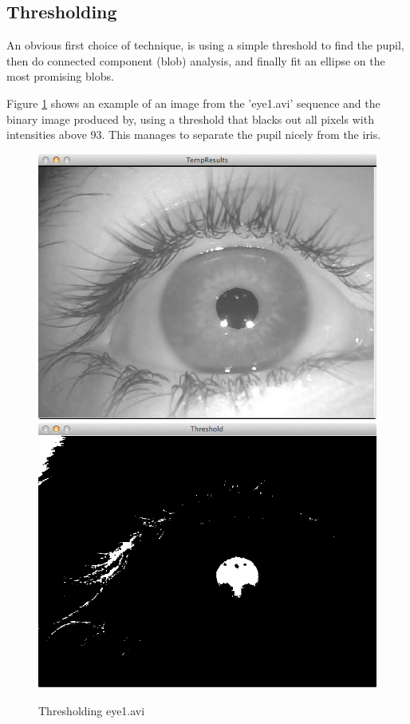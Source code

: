 \documentclass[a4paper,11pt]{article}
\begin{document}
\subsection{Thresholding}
An obvious first choice of technique, is using a simple threshold to find the pupil, then do connected component (blob) analysis, and finally fit an ellipse on the most promising blobs.

Figure \ref{fig:eye1_threshold_93} shows an example of an image from the 'eye1.avi' sequence and the binary image produced by, using a threshold that blacks out all pixels with intensities above 93. This manages to separate the pupil nicely from the iris.

\begin{figure}[ht]
  \centering
  \includegraphics[scale=0.2]{eye1}
  \includegraphics[scale=0.2]{eye1_threshold_93}
  \caption{Thresholding eye1.avi}
  \label{fig:eye1_threshold_93}
\end{figure}
\end{document}
